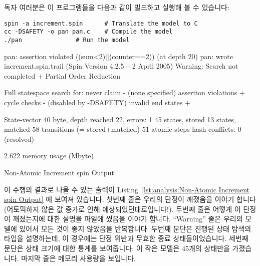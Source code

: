독자 여러분은 이 프로그램들을 다음과 같이 빌드하고 실행해 볼 수 있습니다:
\iffalse

The atomic block on lines~29-39 also contains a similar do-od
loop that sums up the progress counters.
The {\tt assert()} statement on line~38 verifies that if all processes
have been completed, then all counts have been correctly recorded.

You can build and run this program as follows:
\fi

\vspace{5pt}
\begin{minipage}[t]{\columnwidth}
\scriptsize
\begin{verbatim}
spin -a increment.spin		# Translate the model to C
cc -DSAFETY -o pan pan.c	# Compile the model
./pan				# Run the model
\end{verbatim}
\end{minipage}
\vspace{5pt}

\begin{listing*}[tbp]
{ \scriptsize
\begin{verbbox}
pan: assertion violated ((sum<2)||(counter==2)) (at depth 20)
pan: wrote increment.spin.trail
(Spin Version 4.2.5 -- 2 April 2005)
Warning: Search not completed
        + Partial Order Reduction

Full statespace search for:
        never claim             - (none specified)
        assertion violations    +
        cycle checks            - (disabled by -DSAFETY)
        invalid end states      +

State-vector 40 byte, depth reached 22, errors: 1
      45 states, stored
      13 states, matched
      58 transitions (= stored+matched)
      51 atomic steps
hash conflicts: 0 (resolved)

2.622  memory usage (Mbyte)
\end{verbbox}
}
\centering
\theverbbox
\caption{Non-Atomic Increment spin Output}
\label{lst:analysis:Non-Atomic Increment spin Output}
\end{listing*}

이 수행의 결과로 나올 수 있는 출력이
Listing~\ref{lst:analysis:Non-Atomic Increment spin Output}
에 보여져 있습니다.
첫번째 줄은 우리의 단정이 깨졌음을 이야기 합니다 (어토믹하지 않은 값 증가로
인해 예상되었던대로입니다!).
두번째 줄은 어떻게 이 단정이 깨졌는지에 대한 설명을  파일에 썼음을
이야기 합니다.
``Warning''  줄은 우리의 모델에 있어서 모든 것이 좋지 않았음을 반복합니다.
두번째 문단은 진행된 상태 탐색의 타입을 설명하는데, 이 경우에는 단정 위반과
무효한 종료 상태들이었습니다.
세번째 문단은 상태 크기에 대한 통계를 보여줍니다: 이 작은 모델은 45개의
상태만을 가졌습니다.
마지막 줄은 메모리 사용량을 보입니다.


